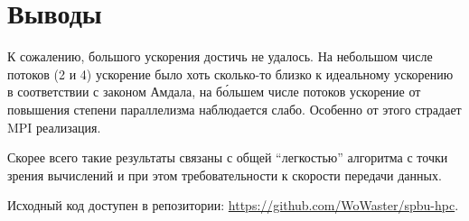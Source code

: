 \documentclass{scrartcl}
\begin{document}
\section*{Выводы}

К сожалению, большого ускорения достичь не удалось.
На небольшом числе потоков (2 и 4) ускорение было хоть сколько-то близко к идеальному ускорению в соответствии с законом Амдала, на б\'ольшем числе потоков ускорение от повышения степени параллелизма наблюдается слабо.
Особенно от этого страдает \textsc{MPI} реализация.

Скорее всего такие результаты связаны с общей \enquote{легкостью} алгоритма с точки зрения вычислений и при этом требовательности к скорости передачи данных.

Исходный код доступен в репозитории: \url{https://github.com/WoWaster/spbu-hpc}.
\end{document}
